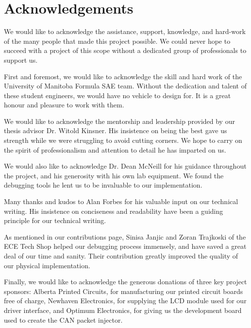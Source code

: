 \chapter*{Acknowledgements}

We would like to acknowledge the assistance, support, knowledge, and hard-work of the many people that made this project possible. We could never hope to succeed with a project of this scope without a dedicated group of professionals to support us.

First and foremost, we would like to acknowledge the skill and hard work of the University of Manitoba Formula SAE team. Without the dedication and talent of these student engineers, we would have no vehicle to design for. It is a great honour and pleasure to work with them.

We would like to acknowledge the mentorship and leadership provided by our thesis advisor Dr. Witold Kinsner. His insistence on being the best gave us strength while we were struggling to avoid cutting corners. We hope to carry on the spirit of professionalism and attention to detail he has imparted on us. 

We would also like to acknowledge Dr. Dean McNeill for his guidance throughout the project, and his generosity with his own lab equipment. We found the debugging tools he lent us to be invaluable to our implementation.

Many thanks and kudos to Alan Forbes for his valuable input on our technical writing. His insistence on conciseness and readability have been a guiding principle for our technical writing. 

As mentioned in our contributions page, Sinisa Janjic and Zoran Trajkoski of the ECE Tech Shop helped our debugging process immensely, and have saved a great deal of our time and sanity. Their contribution greatly improved the quality of our physical implementation.

Finally, we would like to acknowledge the generous donations of three key project sponsors: Alberta Printed Circuits, for manufacturing our printed circuit boards free of charge, Newhaven Electronics, for supplying the LCD module used for our driver interface, and Optimum Electronics, for giving us the development board used to create the CAN packet injector. 
